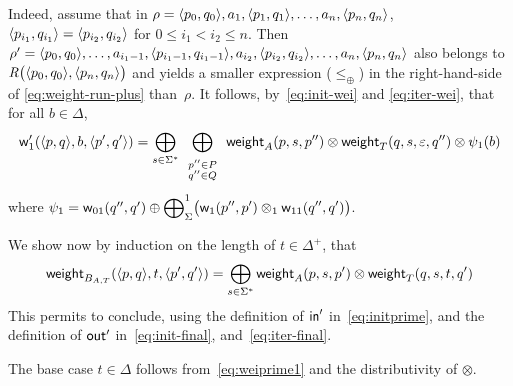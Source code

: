 %
Indeed, assume that in 
$\rho = \< p_0, q_0>, a_1,\< p_1, q_1>,\ldots, a_n, \< p_n, q_n>$, 
$\< p_{i_1}, q_{i_1}> = \< p_{i_2}, q_{i_2}>$
for $0 \leq i_1 < i_2 \leq n$.
Then 
$\rho' = 
 \< p_0, q_0>, \ldots, 
 a_{i_1-1},\< p_{i_1-1}, q_{i_1-1}>,
 a_{i_2},\< p_{i_2}, q_{i_2}>, \ldots,  a_n, \< p_n, q_n>$ 
also belongs to   $\Rho\bigl(\< p_0, q_0>, \< p_n, q_n>\bigr)$
and yields a smaller expression (\wrt $\leq_\oplus$) 
in the right-hand-side of \eqref{eq:weight-run-plus}
than~$\rho$.
It follows, by~\eqref{eq:init-wei} and \eqref{eq:iter-wei}, that
for all $b \in \Delta$, 
%
\begin{equation}\label{eq:weiprime1}
\wei'_1(\< p, q>, b, \< p', q'>) = 
\displaystyle\bigoplus_{s \in \Sigma^*} 
\displaystyle\bigoplus_{\begin{array}{c}
                        \scriptstyle p'' \in P\\[-1ex]
                        \scriptstyle q'' \in Q
                        \end{array}}
\weight_A(p, s, p'') \otimes \weight_T(q, s, \varepsilon, q'') \otimes \psi_1(b)
\end{equation}
where 
$\psi_1 = \mathsf{w}_{01}(q'', q') \oplus
\displaystyle{\bigoplus}_\Sigma^1 \bigl(\mathsf{w}_1(p'', p') 
 \otimes_1 \mathsf{w}_{11}(q'', q')\bigr)$.
%

\medskip
\noindent
We show now by induction on the length of $t \in \Delta^+$, that
\[
\weight_{B_{A, T}}(\<p, q>, t, \<p', q'>) = 
 \displaystyle\bigoplus_{s\in \Sigma^*}
 \weight_{A}(p, s, p') \otimes  \weight_{T}(q, s, t, q')
\]
This permits to conclude, using 
the definition of $\mathsf{in}'$ in~\eqref{eq:initprime},
and the definition of $\mathsf{out}'$ 
in~\eqref{eq:init-final}, and~\eqref{eq:iter-final}. 

\noindent
The base case $t \in \Delta$ follows from~\eqref{eq:weiprime1} and 
the distributivity of $\otimes$.

